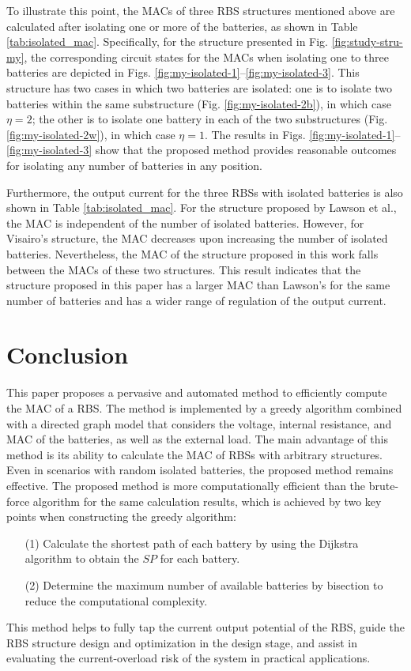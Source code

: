 \documentclass{article}
\begin{document}
To illustrate this point, the MACs of three RBS structures mentioned above are calculated after isolating one or more of the batteries, as shown in Table \ref{tab:isolated_mac}. 
Specifically, for the structure presented in Fig. \ref{fig:study-stru-my}, the corresponding circuit states for the MACs when isolating one to three batteries are depicted in Figs. \ref{fig:my-isolated-1}--\ref{fig:my-isolated-3}. 
This structure has two cases in which two batteries are isolated: 
one is to isolate two batteries within the same substructure (Fig. \ref{fig:my-isolated-2b}), in which case $\eta=2$; the other is to isolate one battery in each of the two substructures (Fig. \ref{fig:my-isolated-2w}), in which case $\eta=1$. 
The results in Figs. \ref{fig:my-isolated-1}--\ref{fig:my-isolated-3} show that the proposed method provides reasonable outcomes for isolating any number of batteries in any position.


Furthermore, the output current for the three RBSs with isolated batteries is also shown in Table \ref{tab:isolated_mac}. 
For the structure proposed by Lawson et al., the MAC is independent of the number of isolated batteries.
However, for Visairo's structure, the MAC decreases upon increasing the number of isolated batteries. 
Nevertheless, the MAC of the structure proposed in this work falls between the MACs of these two structures. 
This result indicates that the structure proposed in this paper has a larger MAC than Lawson's for the same number of batteries and has a wider range of regulation of the output current. 

\section{Conclusion}

This paper proposes a pervasive and automated method to efficiently compute the MAC of a RBS.
The method is implemented by a greedy algorithm combined with a directed graph model that considers the voltage, internal resistance, and MAC of the batteries, as well as the external load.
The main advantage of this method is its ability to calculate the MAC of RBSs with arbitrary structures.
Even in scenarios with random isolated batteries, the proposed method remains effective.
The proposed method is more computationally efficient than the brute-force algorithm for the same calculation results, which is achieved by two key points when constructing the greedy algorithm: 
\begin{enumerate}
\item[(1)] Calculate the shortest path of each battery by using the Dijkstra algorithm to obtain the $SP$ for each battery. 
\item[(2)] Determine the maximum number of available batteries by bisection to reduce the computational complexity.
\end{enumerate}
This method helps to fully tap the current output potential of the RBS, guide the RBS structure design and optimization in the design stage, and assist in evaluating the current-overload risk of the system in practical applications.
\end{document}
